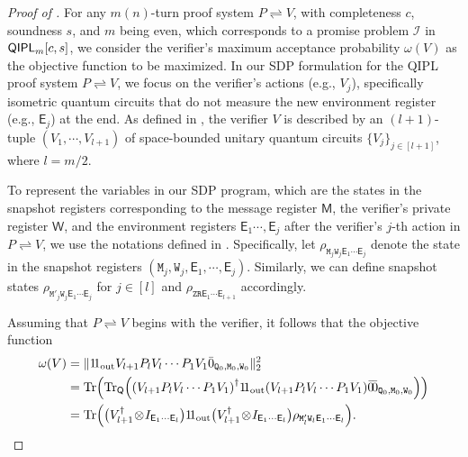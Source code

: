 \documentclass[11pt, a4paper]{article}
\numberwithin{equation}{section}
\numberwithin{figure}{section}
\newcommand{\QIPL}{\textnormal{\textsf{QIPL}}\xspace}
\newcommand{\protocol}[2]{{#1}\!\rightleftharpoons\!{#2}}
\DeclarePairedDelimiter\rbra{\lparen}{\rparen}
\let\ket\relax\DeclarePairedDelimiter\ket{\lvert}{\rangle}
\let\bra\relax\DeclarePairedDelimiter\bra{\langle}{\rvert}
\newcommand{\ketbra}[2]{\ensuremath{\ket{#1}\!\bra{#2}}}
\newcommand{\Tr}{\mathrm{Tr}}
\newcommand{\Out}{\mathrm{out}}
\newcommand{\calI}{\mathcal{I}}
\newcommand{\sfE}{\mathsf{E}}
\newcommand{\sfM}{\mathsf{M}}
\newcommand{\sfQ}{\mathsf{Q}}
\newcommand{\sfW}{\mathsf{W}}
\newcommand{\ttM}{\mathtt{M}}
\newcommand{\ttQ}{\mathtt{Q}}
\newcommand{\ttR}{\mathtt{R}}
\newcommand{\ttW}{\mathtt{W}}
\newcommand{\ttZ}{\mathtt{Z}}
\begin{document}
\begin{proof}[Proof of ]
    For any $m(n)$-turn proof system $\protocol{P}{V}$, with completeness $c$, soundness $s$, and $m$ being even, which corresponds to a promise problem $\calI$ in $\QIPL_m[c,s]$, we consider the verifier's maximum acceptance probability $\omega(V)$ as the objective function to be maximized. 
    In our SDP formulation for the \QIPL{} proof system $\protocol{P}{V}$, we focus on the verifier's actions (e.g., $V_j$), specifically isometric quantum circuits that do not measure the new environment register (e.g., $\sfE_j$) at the end. As defined in , the verifier $V$ is described by an $(l+1)$-tuple $(V_1,\cdots,V_{l+1})$ of space-bounded unitary quantum circuits $\{V_j\}_{j \in [l+1]}$, where $l = m/2$.   

    To represent the variables in our SDP program, which are the states in the snapshot registers corresponding to the message register $\sfM$, the verifier's private register $\sfW$, and the environment registers $\sfE_1\cdots,\sfE_j$ after the verifier's $j$-th action in $\protocol{P}{V}$, we use the notations defined in . Specifically, let $\rho_{\ttM_j\ttW_j\sfE_1\cdots\sfE_j}$ denote the state in the snapshot registers $(\ttM_j, \ttW_j, \sfE_1, \cdots, \sfE_j)$. Similarly, we can define snapshot states $\rho_{\ttM'_j\ttW_j\sfE_1\cdots\sfE_j}$ for $j\in[l]$ and $\rho_{\ttZ\ttR\sfE_1\cdots\sfE_{l+1}}$ accordingly. 

    \vspace{1em}
    Assuming that $\protocol{P}{V}$ begins with the verifier, it follows that the objective function
    \begin{equation}
        \label{eq:QIPUL-objective-function}
        \begin{aligned}
        \omega(V) &= \| \ketbra{1}{1}_{\Out} V_{l+1} P_l V_l \cdots P_1 V_1 \ket{\bar{0}}_{\ttQ_0,\ttM_0,\ttW_0}\|_2^2\\
        &= \Tr\rbra*{ \Tr_{\sfQ}\rbra*{ \rbra*{V_{l+1} P_l V_l \cdots P_1 V_1}^{\dagger} \ketbra{1}{1}_{\Out} \rbra*{V_{l+1} P_l V_l \cdots P_1 V_1} \ketbra{\bar{0}}{\bar{0}}_{\ttQ_0,\ttM_0,\ttW_0} } }\\
        &= \Tr\rbra*{ \big(V^{\dagger}_{l+1} \!\otimes\! I_{\sfE_1\cdots\sfE_{l}}\big) \ketbra{1}{1}_{\Out} \big(V^{\dagger}_{l+1} \!\otimes\! I_{\sfE_1\cdots\sfE_{l}}\big)  \rho_{\ttM'_l\ttW_l\sfE_1\cdots\sfE_l} }.
        \end{aligned}
    \end{equation}
    

\end{proof}
\end{document}
